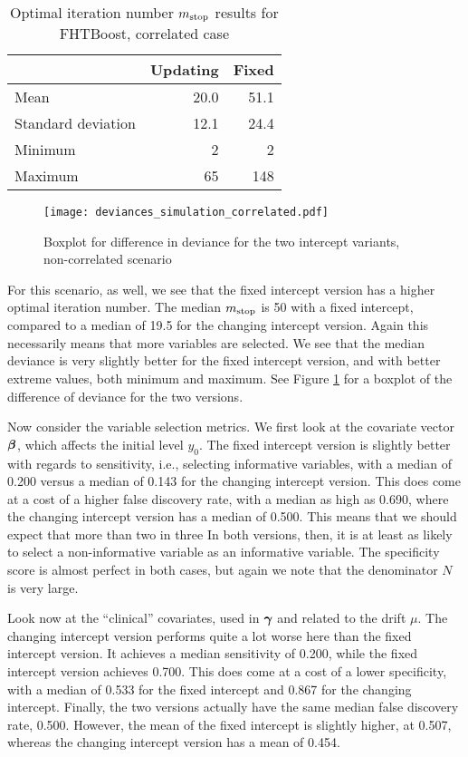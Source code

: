 \begin{table}
\caption{Optimal iteration number $m_{\text{stop}}$ results for FHTBoost, correlated case}
\label{table:correlated-mstop}
\centering
\begin{tabular}{l|rr}
\toprule
& Updating & Fixed \\
\hline
Mean               &  20.0  &  51.1  \\
Standard deviation &  12.1  &  24.4  \\
Minimum            &     2  &     2  \\
Maximum            &    65  &   148  \\
\bottomrule
\end{tabular}
\end{table}

\begin{figure}
\caption{Boxplot for difference in deviance for the two intercept variants, non-correlated scenario}
\label{fig:simulation-correlated-deviances-boxplot}
\centering\texttt{[image: deviances\_simulation\_correlated.pdf]}
\end{figure}

For this scenario, as well, we see that the fixed intercept version has a higher optimal iteration number.
The median $m_{\text{stop}}$ is 50 with a fixed intercept, compared to a median of 19.5 for the changing intercept version.
Again this necessarily means that more variables are selected.
We see that the median deviance is very slightly better for the fixed intercept version, and with better extreme values, both minimum and maximum.
See Figure \ref{fig:simulation-correlated-deviances-boxplot} for a boxplot of the difference of deviance for the two versions.

Now consider the variable selection metrics.
We first look at the covariate vector $\boldsymbol{\beta}$, which affects the initial level $y_0$.
The fixed intercept version is slightly better with regards to sensitivity, i.e., selecting informative variables, with a median of 0.200 versus a median of 0.143 for the changing intercept version.
This does come at a cost of a higher false discovery rate, with a median as high as 0.690, where the changing intercept version has a median of 0.500.
This means that we should expect that more than two in three 
In both versions, then, it is at least as likely to select a non-informative variable as an informative variable.
The specificity score is almost perfect in both cases, but again we note that the denominator $N$ is very large.

Look now at the ``clinical'' covariates, used in $\boldsymbol{\gamma}$ and related to the drift $\mu$.
The changing intercept version performs quite a lot worse here than the fixed intercept version.
It achieves a median sensitivity of 0.200, while the fixed intercept version achieves 0.700.
This does come at a cost of a lower specificity, with a median of 0.533 for the fixed intercept and 0.867 for the changing intercept.
Finally, the two versions actually have the same median false discovery rate, 0.500.
However, the mean of the fixed intercept is slightly higher, at 0.507, whereas the changing intercept version has a mean of 0.454.

